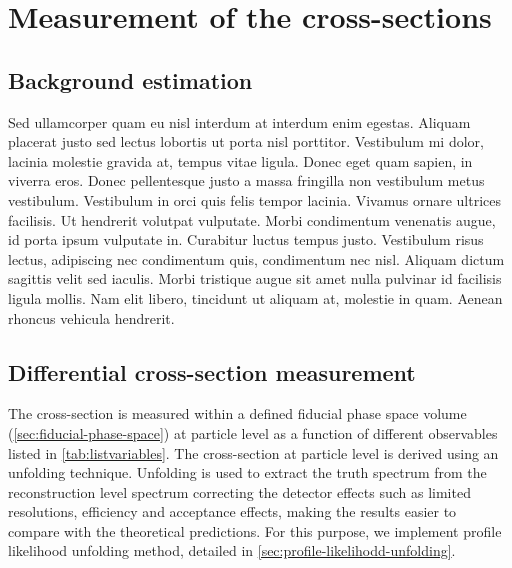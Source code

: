 
\chapter{Measurement of the \tty cross-sections} %
\label{Chapter3} %








\section{Background estimation}
\label{sec:background-estimation}

Sed ullamcorper quam eu nisl interdum at interdum enim egestas. Aliquam placerat justo sed lectus lobortis ut porta nisl porttitor. Vestibulum mi dolor, lacinia molestie gravida at, tempus vitae ligula. Donec eget quam sapien, in viverra eros. Donec pellentesque justo a massa fringilla non vestibulum metus vestibulum. Vestibulum in orci quis felis tempor lacinia. Vivamus ornare ultrices facilisis. Ut hendrerit volutpat vulputate. Morbi condimentum venenatis augue, id porta ipsum vulputate in. Curabitur luctus tempus justo. Vestibulum risus lectus, adipiscing nec condimentum quis, condimentum nec nisl. Aliquam dictum sagittis velit sed iaculis. Morbi tristique augue sit amet nulla pulvinar id facilisis ligula mollis. Nam elit libero, tincidunt ut aliquam at, molestie in quam. Aenean rhoncus vehicula hendrerit.






\section{Differential cross-section measurement}
\label{sec:diff-xsec-measurement}
The cross-section is measured within a defined fiducial phase space volume (\cref{sec:fiducial-phase-space}) at particle level as a function of different observables listed in \cref{tab:listvariables}. The cross-section at particle level is derived using an unfolding technique. Unfolding is used to extract the truth spectrum from the reconstruction level spectrum correcting the detector effects such as limited resolutions, efficiency and acceptance effects, making the results easier to compare with the theoretical predictions. 
For this purpose, we implement profile likelihood unfolding method, detailed in \cref{sec:profile-likelihodd-unfolding}. 

